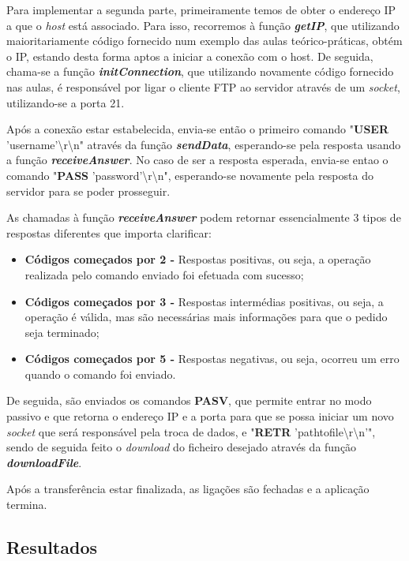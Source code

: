 \documentclass[11pt]{article}
\begin{document}
Para implementar a segunda parte, primeiramente temos de obter o endereço IP a que o \emph{host} está associado. Para isso, recorremos à função \textit{\textbf{getIP}}, que utilizando maioritariamente código fornecido num exemplo das aulas teórico-práticas, obtém o IP, estando desta forma aptos a iniciar a conexão com o host. De seguida, chama-se a função \textit{\textbf{initConnection}}, que utilizando novamente código fornecido nas aulas, é responsável por ligar o cliente FTP ao servidor através de um \textit{socket}, utilizando-se a porta 21.

Após a conexão estar estabelecida, envia-se então o primeiro comando "\textbf{USER} 'username'\textbackslash r\textbackslash n" através da função \textit{\textbf{sendData}}, esperando-se pela resposta usando a função \textit{\textbf{receiveAnswer}}. No caso de ser a resposta esperada, envia-se entao o comando "\textbf{PASS} 'password'\textbackslash r\textbackslash n", esperando-se novamente pela resposta do servidor para se poder prosseguir.

As chamadas à função \textit{\textbf{receiveAnswer}} podem retornar essencialmente 3 tipos de respostas diferentes que importa clarificar:

\begin{itemize}
    \item \textbf{Códigos começados por 2 -} Respostas positivas, ou seja, a operação realizada pelo comando enviado foi efetuada com sucesso;
    \item \textbf{Códigos começados por 3 -} Respostas intermédias positivas, ou seja, a operação é válida, mas são necessárias mais informações para que o pedido seja terminado;
    \item \textbf{Códigos começados por 5 -} Respostas negativas, ou seja, ocorreu um erro quando o comando foi enviado.
\end{itemize}

De seguida, são enviados os comandos \textbf{PASV}, que permite entrar no modo passivo e que retorna o endereço IP e a porta para que se possa iniciar um novo \emph{socket} que será responsável pela troca de dados, e "\textbf{RETR} 'path\textunderscore to\textunderscore file\textbackslash r\textbackslash n'", sendo de seguida feito o \emph{download} do ficheiro desejado através da função \textit{\textbf{downloadFile}}. 

Após a transferência estar finalizada, as ligações são fechadas e a aplicação termina.

\subsection{Resultados}
\end{document}
